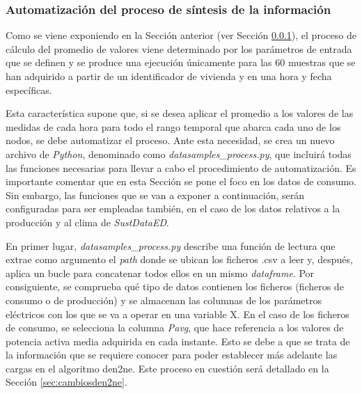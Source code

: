 \subsubsection{Automatización del proceso de síntesis de la información}
\label{sec:datasamples}

Como se viene exponiendo en la Sección anterior (ver Sección \ref{sec:datasamples}), el proceso de cálculo del promedio de valores viene determinado por los parámetros de entrada que se definen y se produce una ejecución únicamente para las 60 muestras que se han adquirido a partir de un identificador de vivienda y en una hora y fecha específicas. 

\vspace{3mm}

Esta característica supone que, si se desea aplicar el promedio a los valores de las medidas de cada hora para todo el rango temporal que abarca cada uno de los nodos, se debe automatizar el proceso. Ante esta necesidad, se crea un nuevo archivo de \textit{Python}, denominado como \textit{datasamples\_process.py}, que incluirá todas las funciones necesarias para llevar a cabo el procedimiento de automatización. Es importante comentar que en esta Sección se pone el foco en los datos de consumo. Sin embargo, las funciones que se van a exponer a continuación, serán configuradas para ser empleadas también, en el caso de los datos relativos a la producción y al clima de \textit{SustDataED}.

\vspace{3mm}

En primer lugar, \textit{datasamples\_process.py} describe una función de lectura que extrae como argumento el \textit{path} donde se ubican los ficheros .csv a leer y, después, aplica un bucle para concatenar todos ellos en un mismo \textit{dataframe}. Por consiguiente, se comprueba qué tipo de datos contienen los ficheros (ficheros de consumo o de producción) y se almacenan las columnas de los parámetros eléctricos con los que se va a operar en una variable X. En el caso de los ficheros de consumo, se selecciona la columna \textit{Pavg}, que hace referencia a los valores de potencia activa media adquirida en cada instante. Esto se debe a que se trata de la información que se requiere conocer para poder establecer más adelante las cargas en el algoritmo \gls{den2ne}. Este proceso en cuestión será detallado en la Sección \ref{sec:cambiosden2ne}.

\vspace{3mm}

